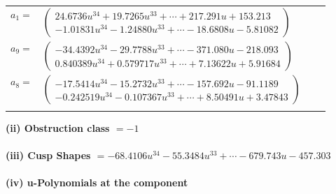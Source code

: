 \documentclass[1p]{elsarticle_modified}
\theoremstyle{definition}
\begin{document}
\begin{tabular}{m{7pt} m{180pt} m{7pt} m{180pt} }
\flushright $a_{1}=$&$\begin{pmatrix}24.6736 u^{34}+19.7265 u^{33}+\cdots+217.291 u+153.213\\-1.01831 u^{34}-1.24880 u^{33}+\cdots-18.6808 u-5.81082\end{pmatrix}$ \\
\flushright $a_{9}=$&$\begin{pmatrix}-34.4392 u^{34}-29.7788 u^{33}+\cdots-371.080 u-218.093\\0.840389 u^{34}+0.579717 u^{33}+\cdots+7.13622 u+5.91684\end{pmatrix}$ \\
\flushright $a_{8}=$&$\begin{pmatrix}-17.5414 u^{34}-15.2732 u^{33}+\cdots-157.692 u-91.1189\\-0.242519 u^{34}-0.107367 u^{33}+\cdots+8.50491 u+3.47843\end{pmatrix}$\\&\end{tabular}
\flushleft \textbf{(ii) Obstruction class $= -1$}\\~\\
\flushleft \textbf{(iii) Cusp Shapes $= -68.4106 u^{34}-55.3484 u^{33}+\cdots-679.743 u-457.303$}\\~\\
\newpage\renewcommand{\arraystretch}{1}
\flushleft \textbf{(iv) u-Polynomials at the component}\newline \\
\end{document}
